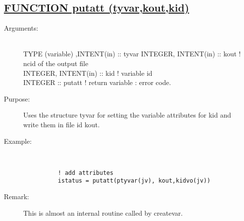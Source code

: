 \documentclass[a4paper,11pt]{article}
\begin{document}
\subsection*{\underline{FUNCTION  putatt (tyvar,kout,kid)  }}
\begin{description}
\item[Arguments:] \ \\
    TYPE (variable) ,INTENT(in) :: tyvar
    INTEGER, INTENT(in) :: kout              ! ncid of the output file \\
    INTEGER, INTENT(in) :: kid               ! variable id \\
    INTEGER :: putatt                        ! return variable : error code.
\item[Purpose:]  Uses the structure tyvar for setting the variable attributes for kid and  write them in file id kout.
\item[Example:]\ \\
\begin{verbatim}
          ! add attributes
          istatus = putatt(ptyvar(jv), kout,kidvo(jv))
\end{verbatim}
\item[Remark:] This is almost an internal routine called by createvar.
\end{description}
\newpage
\end{document}
